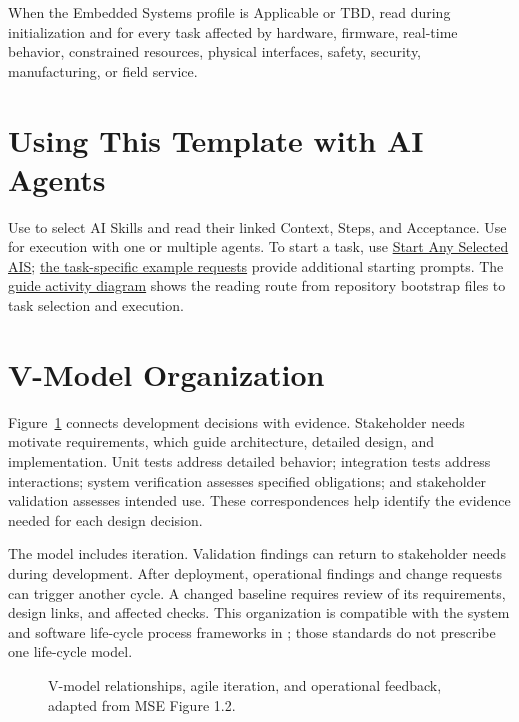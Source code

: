 When the Embedded Systems profile is Applicable or TBD, read
 during initialization and for every task
affected by hardware, firmware, real-time behavior, constrained resources,
physical interfaces, safety, security, manufacturing, or field service.

\section{Using This Template with AI Agents}
\label{Section:UsingTemplateAI}
Use  to select AI Skills and read their
linked Context, Steps, and Acceptance. Use
 for execution with one or multiple
agents. To start a task, use
\hyperref[Section:AIStartSelectedTaskPrompt]{Start Any Selected AIS};
\hyperref[Section:AIExamplePrompts]{the task-specific example requests}
provide additional starting prompts. The
\hyperref[Figure:AIGuideActivity]{guide activity diagram} shows the reading
route from repository bootstrap files to task selection and execution.

\section{V-Model Organization}
Figure~\ref{Figure:VModel} connects development decisions with evidence.
Stakeholder needs motivate requirements, which guide architecture, detailed
design, and implementation. Unit tests address detailed behavior; integration
tests address interactions; system verification assesses specified obligations;
and stakeholder validation assesses intended use. These correspondences help
identify the evidence needed for each design decision.

The model includes iteration. Validation findings can return to stakeholder
needs during development. After deployment, operational findings and change
requests can trigger another cycle. A changed baseline requires review of its
requirements, design links, and affected checks. This organization is
compatible with the system and software life-cycle process frameworks in
\cite{ISO15288,ISO12207}; those standards do not prescribe one life-cycle model.

\begin{figure}[htbp]
\centering
\resizebox{\textwidth}{!}{}
\caption{V-model relationships, agile iteration, and operational feedback, adapted from MSE Figure 1.2.}
\label{Figure:VModel}
\end{figure}
